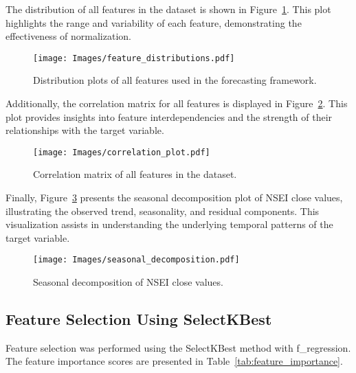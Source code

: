 The distribution of all features in the dataset is shown in Figure~\ref{fig:feature_distributions}. This plot highlights the range and variability of each feature, demonstrating the effectiveness of normalization.

\begin{figure}[h!]
    \centering
    \texttt{[image: Images/feature\_distributions.pdf]}
    \caption{Distribution plots of all features used in the forecasting framework.}
    \label{fig:feature_distributions}
\end{figure}

Additionally, the correlation matrix for all features is displayed in Figure~\ref{fig:correlation_plot}. This plot provides insights into feature interdependencies and the strength of their relationships with the target variable.

\begin{figure}[h!]
    \centering
    \texttt{[image: Images/correlation\_plot.pdf]}
    \caption{Correlation matrix of all features in the dataset.}
    \label{fig:correlation_plot}
\end{figure}

Finally, Figure~\ref{fig:seasonal_decomposition} presents the seasonal decomposition plot of NSEI close values, illustrating the observed trend, seasonality, and residual components. This visualization assists in understanding the underlying temporal patterns of the target variable.

\begin{figure}[h!]
    \centering
    \texttt{[image: Images/seasonal\_decomposition.pdf]}
    \caption{Seasonal decomposition of NSEI close values.}
    \label{fig:seasonal_decomposition}
\end{figure}

\subsection{Feature Selection Using SelectKBest}
Feature selection was performed using the SelectKBest method with \textsf{f\_regression}. The feature importance scores are presented in Table~\ref{tab:feature_importance}.


